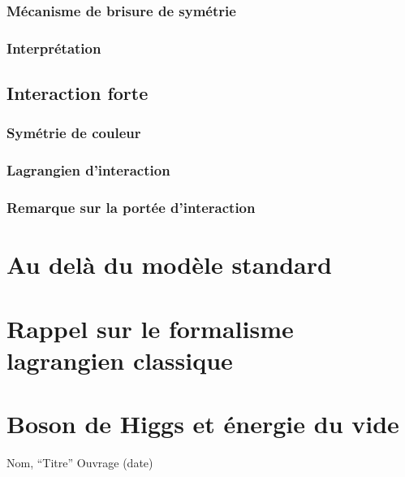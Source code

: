 \documentclass{article}
\begin{document}
				\subsubsection{Mécanisme de brisure de symétrie}
				\subsubsection{Interprétation}
			\subsection{Interaction forte}
				\subsubsection{Symétrie de couleur}
				\subsubsection{Lagrangien d'interaction}
				\subsubsection{Remarque sur la portée d'interaction}
		
		
		
		\section{Au delà du modèle standard}
		
		
		\begin{appendices}
			\section{Rappel sur le formalisme lagrangien classique}

			\section{Boson de Higgs et énergie du vide}
		\end{appendices}
		
		\begin{thebibliography}{4}
			Nom,
			``Titre''
			Ouvrage (date) 
			

			\end{thebibliography}
	
\end{document}
